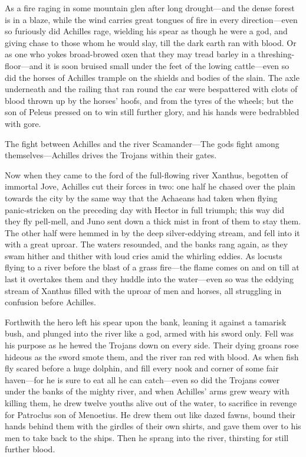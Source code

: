 As a fire raging in some mountain glen after long drought—and the
dense forest is in a blaze, while the wind carries great tongues of fire
in every direction—even so furiously did Achilles rage, wielding his
spear as though he were a god, and giving chase to those whom he would
slay, till the dark earth ran with blood. Or as one who yokes broad-browed
oxen that they may tread barley in a threshing-floor—and it is soon
bruised small under the feet of the lowing cattle—even so did the
horses of Achilles trample on the shields and bodies of the slain. The
axle underneath and the railing that ran round the car were bespattered
with clots of blood thrown up by the horses’ hoofs, and from the tyres of
the wheels; but the son of Peleus pressed on to win still further glory,
and his hands were bedrabbled with gore.


The fight between Achilles and the river Scamander—The gods fight
among themselves—Achilles drives the Trojans within their gates.

Now when they came to the ford of the full-flowing river Xanthus, begotten
of immortal Jove, Achilles cut their forces in two: one half he chased
over the plain towards the city by the same way that the Achaeans had
taken when flying panic-stricken on the preceding day with Hector in full
triumph; this way did they fly pell-mell, and Juno sent down a thick mist
in front of them to stay them. The other half were hemmed in by the deep
silver-eddying stream, and fell into it with a great uproar. The waters
resounded, and the banks rang again, as they swam hither and thither with
loud cries amid the whirling eddies. As locusts flying to a river before
the blast of a grass fire—the flame comes on and on till at last it
overtakes them and they huddle into the water—even so was the
eddying stream of Xanthus filled with the uproar of men and horses, all
struggling in confusion before Achilles.

Forthwith the hero left his spear upon the bank, leaning it against a
tamarisk bush, and plunged into the river like a god, armed with his sword
only. Fell was his purpose as he hewed the Trojans down on every side.
Their dying groans rose hideous as the sword smote them, and the river ran
red with blood. As when fish fly scared before a huge dolphin, and fill
every nook and corner of some fair haven—for he is sure to eat all
he can catch—even so did the Trojans cower under the banks of the
mighty river, and when Achilles’ arms grew weary with killing them, he
drew twelve youths alive out of the water, to sacrifice in revenge for
Patroclus son of Menoetius. He drew them out like dazed fawns, bound their
hands behind them with the girdles of their own shirts, and gave them over
to his men to take back to the ships. Then he sprang into the river,
thirsting for still further blood.


